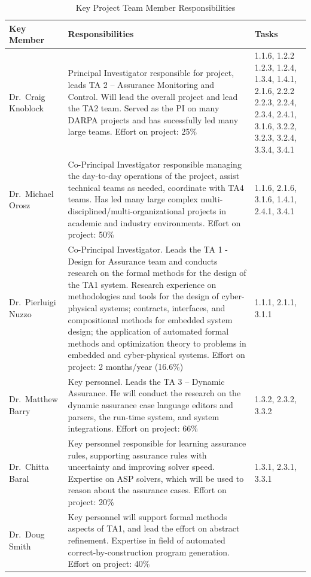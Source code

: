 \documentclass[12pt]{dod-blank}
\begin{document}
\begin{table}[tbhp]
\caption{\small Key Project Team Member Responsibilities}
  \centering
  {\footnotesize
\begin{tabular}{| m{.75in} | m{3.9in}| m{1.5in}|} 
\hline
\textbf{Key Member} & \textbf{Responsibilities} & \textbf{Tasks} 
\\\hline
Dr.\ Craig Knoblock  & Principal Investigator responsible for project, leads TA 2 – Assurance Monitoring and Control.  Will lead the overall project and lead the TA2 team.  Served as the PI on many DARPA projects and has sucessfully led many large teams.    Effort on project:  25\% &
1.1.6, 1.2.2 1.2.3, 1.2.4, 1.3.4, 1.4.1, 
2.1.6, 2.2.2 2.2.3, 2.2.4, 2.3.4, 2.4.1, 
3.1.6, 3.2.2, 3.2.3, 3.2.4, 3.3.4, 3.4.1
\\
\hline
Dr.\ Michael Orosz & Co-Principal Investigator responsible managing the day-to-day operations of the project, assist technical teams as needed, coordinate with TA4 teams.    Has led many large complex multi-disciplined/multi-organizational projects in academic and industry environments.  Effort on project: 50\%
& 1.1.6, 2.1.6, 3.1.6, 1.4.1, 2.4.1, 3.4.1
  \\ 
\hline
Dr.\ Pierluigi Nuzzo 
& 
Co-Principal Investigator.  Leads the TA 1 - Design for Assurance team and conducts research on the formal methods for the design of the TA1 system.  Research experience on methodologies and tools for the design of cyber-physical systems; contracts, interfaces, and compositional methods for embedded system design; the application of automated formal methods and optimization theory to problems in embedded and cyber-physical systems.  Effort on project: 2 months/year (16.6\%)
& 
1.1.1, 2.1.1, 3.1.1 \\
\hline
Dr.\ Matthew Barry
& 
Key personnel.  Leads the TA 3 – Dynamic Assurance.   He will conduct the research on the dynamic assurance case language editors and parsers, the run-time system, and system integrations. Effort on project:  66\%
& 
1.3.2, 2.3.2, 3.3.2\\
\hline
Dr.\ Chitta Baral
& 
Key personnel responsible for learning assurance rules, supporting assurance rules with uncertainty and improving solver speed.  Expertise on ASP solvers, which will be used to reason about the assurance cases. Effort on project: 20\%
& 
1.3.1, 2.3.1, 3.3.1 \\
\hline
Dr.\ Doug Smith 
& 
Key personnel will support formal methods aspects of TA1, and lead the effort on abstract refinement. Expertise in field of automated correct-by-construction program generation.    Effort on project: 40\%

\end{tabular}}
\end{table}
\end{document}
